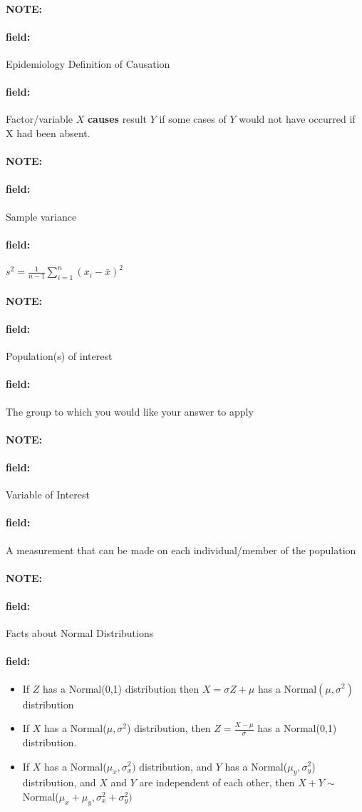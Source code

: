 \documentclass[12pt]{article}
\newenvironment{note}{\paragraph{NOTE:}}{}
\newenvironment{field}{\paragraph{field:}}{}
\begin{document}
\begin{note}
	\begin{field}
		Epidemiology Definition of Causation
	\end{field}
	\begin{field}
		Factor/variable $X$ \textbf{causes} result $Y$ if some cases of $Y$ would not have occurred if X had been absent.
	\end{field}
\end{note}

\begin{note}
	\begin{field}
		Sample variance
	\end{field}
	\begin{field}
		$s^2 = \frac{1}{n-1}\sum_{i=1}^n(x_i - \bar{x})^2$
	\end{field}
\end{note}

\begin{note}
	\begin{field}
		Population(s) of interest
	\end{field}
	\begin{field}
		The group to which you would like your answer to apply
	\end{field}
\end{note}

\begin{note}
	\begin{field}
		Variable of Interest
	\end{field}
	\begin{field}
		A measurement that can be made on each individual/member of the population
	\end{field}
\end{note}

\begin{note}
	\begin{field}
		Facts about Normal Distributions
	\end{field}
	\begin{field}
		\begin{itemize}
			\item If $Z$ has a Normal(0,1) distribution then $X = \sigma Z + \mu$ has a Normal$(\mu,\sigma^2)$ distribution
			\item If $X$ has a Normal($\mu,\sigma^2$) distribution, then $Z = \frac{X - \mu}{\sigma}$ has a Normal(0,1) distribution.
			\item If $X$ has a Normal($\mu_x,\sigma^2_x)$ distribution, and $Y$ has a Normal($\mu_y,\sigma_y^2$) distribution, and $X$ and $Y$ are independent of each other, then $X + Y \sim $ Normal($\mu_x + \mu_y, \sigma_x^2 + \sigma_y^2)$
		\end{itemize}
	\end{field}
\end{note}
\end{document}
